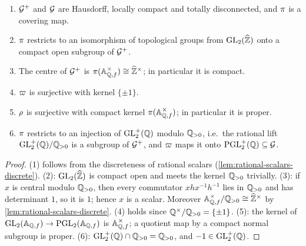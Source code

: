 \begin{lemma}\label{lem:structure-G-plus}
\begin{enumerate}
\item $\mathcal{G}^{+}$ and $\mathcal{G}$ are Hausdorff, locally
  compact and totally disconnected, and $\pi$ is a covering
  map.
\item $\pi$ restricts to an isomorphism of topological groups
  from $\GL{2}{\ProfiniteIntegers}$ onto a compact open subgroup of
  $\mathcal{G}^{+}$.
\item The centre of $\mathcal{G}^{+}$ is
  $\pi(\mathbb{A}_{\mathbb{Q},f}^{\times}) \cong \widehat{\mathbb{Z}}^{\times}$;
  in particular it is compact.
\item $\varpi$ is surjective with kernel $\{\pm 1\}$.
\item $\rho$ is surjective with compact kernel
  $\pi(\mathbb{A}_{\mathbb{Q},f}^{\times})$; in particular it is
  proper.
\item $\pi$ restricts to an injection of
  $\mathrm{GL}_{2}^{+}(\mathbb{Q})$ modulo $\mathbb{Q}_{>0}$, i.e.\ the rational lift
  $\mathrm{GL}_{2}^{+}(\mathbb{Q})/\mathbb{Q}_{>0}$ is a subgroup of $\mathcal{G}^{+}$, and $\varpi$
  maps it onto $\mathrm{PGL}_{2}^{+}(\mathbb{Q}) \subseteq \mathcal{G}$.
\end{enumerate}
\end{lemma}

\begin{proof}
(1) follows from the discreteness of rational scalars
(\cref{lem:rational-scalars-discrete}). (2): $\GL{2}{\ProfiniteIntegers}$ is
compact open and meets the kernel $\mathbb{Q}_{>0}$ trivially. (3): if
$x$ is central modulo $\mathbb{Q}_{>0}$, then every commutator
$x h x^{-1}h^{-1}$ lies in $\mathbb{Q}_{>0}$ and has determinant $1$, so
it is $1$; hence $x$ is a scalar. Moreover
$\mathbb{A}_{\mathbb{Q},f}^{\times}/\mathbb{Q}_{>0} \cong \widehat{\mathbb{Z}}^{\times}$ by
\cref{lem:rational-scalars-discrete}. (4) holds since
$\mathbb{Q}^{\times}/\mathbb{Q}_{>0} = \{\pm 1\}$. (5): the kernel of
$\GL{2}{\FiniteAdeles{\QQ}} \to \PGL{2}{\FiniteAdeles{\QQ}}$ is
$\mathbb{A}_{\mathbb{Q},f}^{\times}$; a quotient map by a compact normal subgroup is
proper. (6): $\mathrm{GL}_{2}^{+}(\mathbb{Q})\cap\mathbb{Q}_{>0} = \mathbb{Q}_{>0}$, and
$-1 \in \mathrm{GL}_{2}^{+}(\mathbb{Q})$.
\end{proof}


